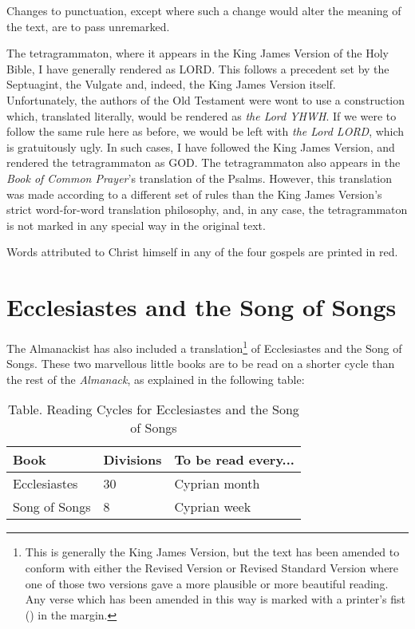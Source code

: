 \documentclass[0main.tex]{subfiles}
\begin{document}
Changes to punctuation, except where such a change would alter the meaning of the text, are to pass unremarked.

The tetragrammaton, where it appears in the King James Version of the Holy Bible, I have generally rendered as {\hge LORD}. This follows a precedent set by the Septuagint, the Vulgate and, indeed, the King James Version itself. Unfortunately, the authors of the Old Testament were wont to use a construction which, translated literally, would be rendered as \emph{the Lord YHWH}. If we were to follow the same rule here as before, we would be left with \emph{the Lord {\hge LORD}}, which is gratuitously ugly. In such cases, I have followed the King James Version, and rendered the tetragrammaton as {\hge GOD}. The tetragrammaton also appears in the \emph{Book of Common Prayer}'s translation of the Psalms. However, this translation was made according to a different set of rules than the King James Version's strict word-for-word translation philosophy, and, in any case, the tetragrammaton is not marked in any special way in the original text.

Words attributed to Christ himself in any of the four gospels are printed in {\color{red} red}.

\section{Ecclesiastes and the Song of Songs}

The Almanackist has also included a translation\footnote{This is generally the King James Version, but the text has been amended to conform with either the Revised Version or Revised Standard Version where one of those two versions gave a more plausible or more beautiful reading. Any verse which has been amended in this way is marked with a printer's fist () in the margin.} of Ecclesiastes and the Song of Songs. These two marvellous little books are to be read on a shorter cycle than the rest of the \emph{Almanack}, as explained in the following table:

\begin{table}[h]
\centering
\caption*{{\sc Table.} Reading Cycles for Ecclesiastes and the Song of Songs}
\begin{tabular}{p{3cm}|p{3cm}|p{4cm}}
{\sc Book} & {\sc Divisions} & {\sc To be read every...}\\ \hline \hline
Ecclesiastes & 30 & Cyprian month\\ \hline
Song of Songs & 8 & Cyprian week
\end{tabular}
\end{table}
\end{document}
